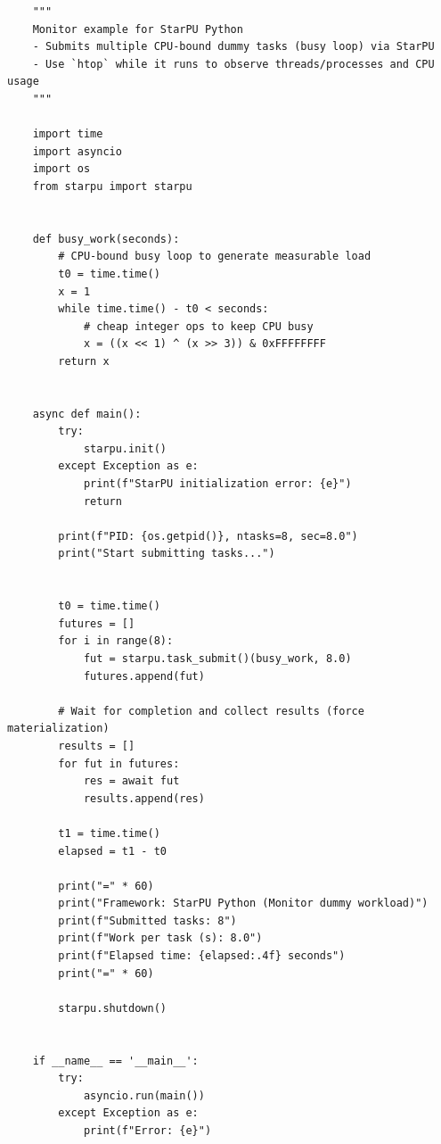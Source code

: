 \begin{verbatim}
    """
    Monitor example for StarPU Python
    - Submits multiple CPU-bound dummy tasks (busy loop) via StarPU
    - Use `htop` while it runs to observe threads/processes and CPU usage
    """

    import time
    import asyncio
    import os
    from starpu import starpu


    def busy_work(seconds):
        # CPU-bound busy loop to generate measurable load
        t0 = time.time()
        x = 1
        while time.time() - t0 < seconds:
            # cheap integer ops to keep CPU busy
            x = ((x << 1) ^ (x >> 3)) & 0xFFFFFFFF
        return x


    async def main():
        try:
            starpu.init()
        except Exception as e:
            print(f"StarPU initialization error: {e}")
            return

        print(f"PID: {os.getpid()}, ntasks=8, sec=8.0")
        print("Start submitting tasks...")


        t0 = time.time()
        futures = []
        for i in range(8):
            fut = starpu.task_submit()(busy_work, 8.0)
            futures.append(fut)

        # Wait for completion and collect results (force materialization)
        results = []
        for fut in futures:
            res = await fut
            results.append(res)

        t1 = time.time()
        elapsed = t1 - t0

        print("=" * 60)
        print("Framework: StarPU Python (Monitor dummy workload)")
        print(f"Submitted tasks: 8")
        print(f"Work per task (s): 8.0")
        print(f"Elapsed time: {elapsed:.4f} seconds")
        print("=" * 60)

        starpu.shutdown()


    if __name__ == '__main__':
        try:
            asyncio.run(main())
        except Exception as e:
            print(f"Error: {e}")
\end{verbatim}
